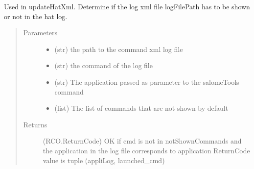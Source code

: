 \documentclass[a4paper,10pt,english]{sphinxmanual}
\begin{document}
\begin{fulllineitems}
\label{\detokenize{apidoc_src/src:src.utilsSat.show_command_log}}
Used in updateHatXml. 
Determine if the log xml file logFilePath 
has to be shown or not in the hat log.
\begin{quote}\begin{description}
\item[{Parameters}] \leavevmode\begin{itemize}
\item {} 
 \textendash{} (str) the path to the command xml log file

\item {} 
 \textendash{} (str) the command of the log file

\item {} 
 \textendash{} (str) 
The application passed as parameter to the salomeTools command

\item {} 
 \textendash{} (list) 
The list of commands that are not shown by default

\end{itemize}

\item[{Returns}] \leavevmode
(RCO.ReturnCode)
OK if cmd is not in notShownCommands and the application 
in the log file corresponds to application
ReturnCode value is tuple (appliLog, launched\_cmd)

\end{description}\end{quote}

\end{fulllineitems}


\begin{fulllineitems}
\label{\detokenize{apidoc_src/src:src.utilsSat.success}}
\end{fulllineitems}

\end{document}
